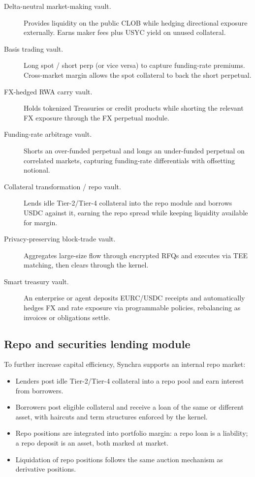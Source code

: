 \documentclass[11pt,a4paper]{article}
\begin{document}
\begin{description}
  \item[Delta-neutral market-making vault.] Provides liquidity on the public CLOB while hedging directional exposure externally. Earns maker fees plus USYC yield on unused collateral.
  \item[Basis trading vault.] Long spot / short perp (or vice versa) to capture funding-rate premiums. Cross-market margin allows the spot collateral to back the short perpetual.
  \item[FX-hedged RWA carry vault.] Holds tokenized Treasuries or credit products while shorting the relevant FX exposure through the FX perpetual module.
  \item[Funding-rate arbitrage vault.] Shorts an over-funded perpetual and longs an under-funded perpetual on correlated markets, capturing funding-rate differentials with offsetting notional.
  \item[Collateral transformation / repo vault.] Lends idle Tier-2/Tier-4 collateral into the repo module and borrows USDC against it, earning the repo spread while keeping liquidity available for margin.
  \item[Privacy-preserving block-trade vault.] Aggregates large-size flow through encrypted RFQs and executes via TEE matching, then clears through the kernel.
  \item[Smart treasury vault.] An enterprise or agent deposits EURC/USDC receipts and automatically hedges FX and rate exposure via programmable policies, rebalancing as invoices or obligations settle.
\end{description}

\subsection{Repo and securities lending module}

To further increase capital efficiency, Synchra supports an internal repo market:
\begin{itemize}
  \item Lenders post idle Tier-2/Tier-4 collateral into a repo pool and earn interest from borrowers.
  \item Borrowers post eligible collateral and receive a loan of the same or different asset, with haircuts and term structures enforced by the kernel.
  \item Repo positions are integrated into portfolio margin: a repo loan is a liability; a repo deposit is an asset, both marked at market.
  \item Liquidation of repo positions follows the same auction mechanism as derivative positions.
\end{itemize}
\end{document}
